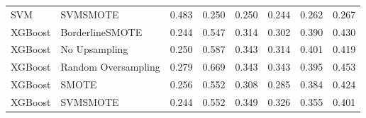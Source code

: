 \begin{tabular}{llllllll}
                            SVM &                      SVMSMOTE & 0.483 &                     0.250 &                 0.250 &                  0.244 &                                   0.262 &    0.267 \\
                        XGBoost &               BorderlineSMOTE & 0.244 &                     0.547 &                 0.314 &                  0.302 &                                   0.390 &    0.430 \\
                        XGBoost &                 No Upsampling & 0.250 &                     0.587 &                 0.343 &                  0.314 &                                   0.401 &    0.419 \\
                        XGBoost &           Random Oversampling & 0.279 &                     0.669 &                 0.343 &                  0.343 &                                   0.395 &    0.453 \\
                        XGBoost &                         SMOTE & 0.256 &                     0.552 &                 0.308 &                  0.285 &                                   0.384 &    0.424 \\
                        XGBoost &                      SVMSMOTE & 0.244 &                     0.552 &                 0.349 &                  0.326 &                                   0.355 &    0.401 \\
\bottomrule
\end{tabular}
